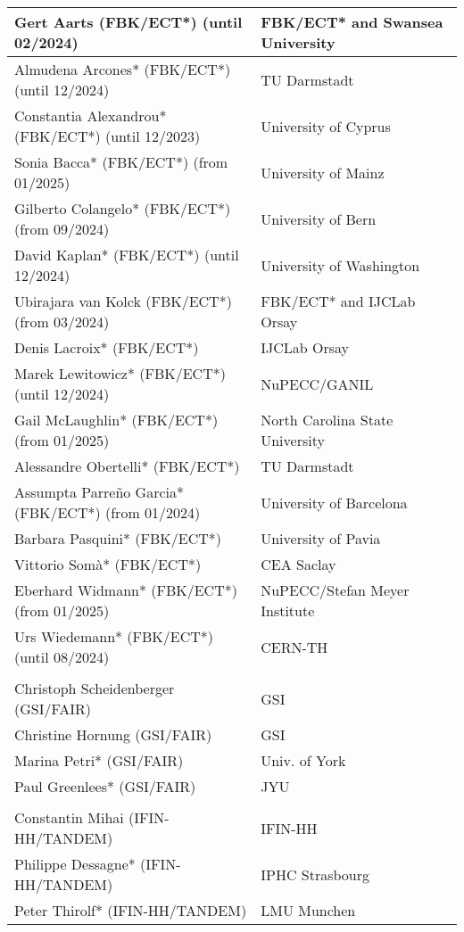 \begin{longtable}{|L{0.48\textwidth}|C{0.48\textwidth}|}
Gert Aarts (FBK/ECT*)  (until 02/2024)  & FBK/ECT* and Swansea University \\ \hline
Almudena Arcones* (FBK/ECT*)  (until 12/2024) &  TU Darmstadt \\ \hline
Constantia Alexandrou* (FBK/ECT*)  (until 12/2023) & University of Cyprus \\ \hline
Sonia Bacca* (FBK/ECT*)  (from 01/2025) &  University of Mainz \\ \hline
Gilberto Colangelo* (FBK/ECT*) (from 09/2024) & University of Bern\\ \hline
David Kaplan* (FBK/ECT*)  (until 12/2024) & University of Washington \\ \hline
Ubirajara van Kolck (FBK/ECT*)  (from 03/2024)  & FBK/ECT* and IJCLab Orsay \\ \hline   
Denis Lacroix* (FBK/ECT*)  & IJCLab Orsay \\ \hline
Marek Lewitowicz* (FBK/ECT*)  (until 12/2024)  & NuPECC/GANIL \\ \hline
Gail McLaughlin* (FBK/ECT*)  (from 01/2025) & North Carolina State University \\ \hline
Alessandre Obertelli* (FBK/ECT*)    & TU Darmstadt \\ \hline
Assumpta Parre\~no Garcia* (FBK/ECT*) (from 01/2024) & University of Barcelona \\ \hline
Barbara Pasquini* (FBK/ECT*)    & University of Pavia \\ \hline
Vittorio Somà* (FBK/ECT*)    & CEA Saclay \\ \hline
Eberhard Widmann* (FBK/ECT*) (from 01/2025) & NuPECC/Stefan Meyer Institute\\ \hline
Urs Wiedemann* (FBK/ECT*)  (until 08/2024) & CERN-TH \\ \hline

      \\ \hline
    Christoph Scheidenberger (GSI/FAIR)	& GSI \\ \hline
    Christine Hornung (GSI/FAIR)	& GSI \\ \hline
    Marina Petri* (GSI/FAIR)	& Univ. of York \\ \hline
    Paul Greenlees* (GSI/FAIR)	& JYU \\ \hline

      \\ \hline
    Constantin Mihai (IFIN-HH/TANDEM)	& IFIN-HH \\ \hline
    Philippe Dessagne*  (IFIN-HH/TANDEM)	& IPHC Strasbourg \\ \hline
    Peter Thirolf*  (IFIN-HH/TANDEM)	& LMU Munchen \\ \hline


\end{longtable}
